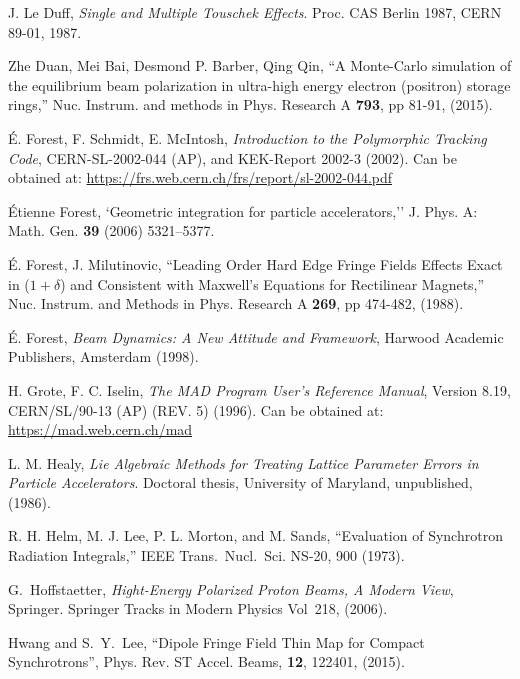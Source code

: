\begin{thebibliography}{XXXXXXX99}
  J. Le Duff, \emph{Single and Multiple Touschek Effects}.
  Proc. CAS Berlin 1987,
  CERN 89-01,
  1987.

 Zhe Duan, Mei Bai, Desmond P. Barber, Qing Qin, 
``A Monte-Carlo simulation of the equilibrium beam polarization in ultra-high energy electron
(positron) storage rings,''
Nuc. Instrum. and methods in Phys. Research A {\bf 793}, pp 81-91, (2015).

\'E. Forest, F. Schmidt, E. McIntosh, 
{\it Introduction to the Polymorphic Tracking Code}, 
CERN-SL-2002-044 (AP), and KEK-Report 2002-3 (2002). 
Can be obtained at:
\hfill\break
\hspace*{0.3in}
\url{https://frs.web.cern.ch/frs/report/sl-2002-044.pdf}

\'Etienne Forest, `Geometric integration for particle accelerators,''
J. Phys. A: Math. Gen. {\bf 39} (2006) 5321–5377.

\'E. Forest, J. Milutinovic, 
``Leading Order Hard Edge Fringe Fields Effects Exact in ($1+\delta$) and 
Consistent with Maxwell's Equations for Rectilinear Magnets,''
Nuc. Instrum. and Methods in Phys. Research A {\bf 269}, pp 474-482, (1988).

\'E. Forest, {\em Beam Dynamics: A New Attitude and Framework},
Harwood Academic Publishers, Amsterdam (1998).


H. Grote, F. C. Iselin, {\it The MAD Program User's Reference Manual},
Version 8.19, CERN/SL/90-13 (AP) (REV. 5) (1996). 
Can be obtained at:
\hfill\break
\hspace*{0.3in}
\url{https://mad.web.cern.ch/mad} 

L. M. Healy, {\it Lie Algebraic Methods for Treating Lattice Parameter
Errors in Particle Accelerators}. Doctoral thesis, University of
Maryland, unpublished, (1986).

R. H. Helm, M. J. Lee, P. L. Morton, and M. Sands, 
``Evaluation of Synchrotron Radiation Integrals,''
IEEE Trans.~Nucl.~Sci. NS-20, 900 (1973).

G.~Hoffstaetter, 
{\it Hight-Energy Polarized Proton Beams, A Modern View}, 
Springer. Springer Tracks in Modern Physics Vol~218, (2006).

Hwang and S.~Y.~Lee, 
``Dipole Fringe Field Thin Map for Compact Synchrotrons'',
Phys. Rev. ST Accel. Beams, {\bf 12}, 122401, (2015).


\end{thebibliography}
